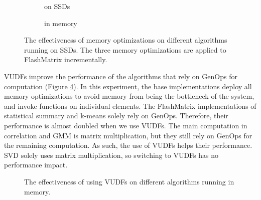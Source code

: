 \begin{figure}
	\centering
	\footnotesize
	\vspace{-15pt}
	\begin{subfigure}{.5\textwidth}
		
		\label{perf:em_opts}
		\vspace{-15pt}
		\caption{on SSDs}
	\end{subfigure}

	\begin{subfigure}{.5\textwidth}
		
		\label{perf:im_opts}
		\vspace{-15pt}
		\caption{in memory}
	\end{subfigure}
	\caption{The effectiveness of memory optimizations on different
			algorithms running on SSDs. The three memory optimizations are
		applied to FlashMatrix incrementally.}
	\label{perf:opts}
\end{figure}

VUDFs improve the performance of the algorithms that rely on GenOps
for computation (Figure \ref{perf:opts_CPU}). In this experiment, the base
implementations deploy all memory optimizations to avoid memory from being
the bottleneck of the system, and invoke functions on individual elements.
The FlashMatrix implementations of statistical summary and k-means solely
rely on GenOps. Therefore, their performance is almost doubled
when we use VUDFs. The main computation in correlation and GMM is matrix
multiplication, but they still rely on GenOps for the remaining computation.
As such, the use of VUDFs helps their performance. SVD solely uses matrix
multiplication, so switching to VUDFs has no performance impact.

\begin{figure}
	\begin{center}
		\footnotesize
		\vspace{-15pt}
		
		\vspace{-10pt}
		\caption{The effectiveness of using VUDFs on different algorithms
		running in memory.}
		\label{perf:opts_CPU}
	\end{center}
\end{figure}
